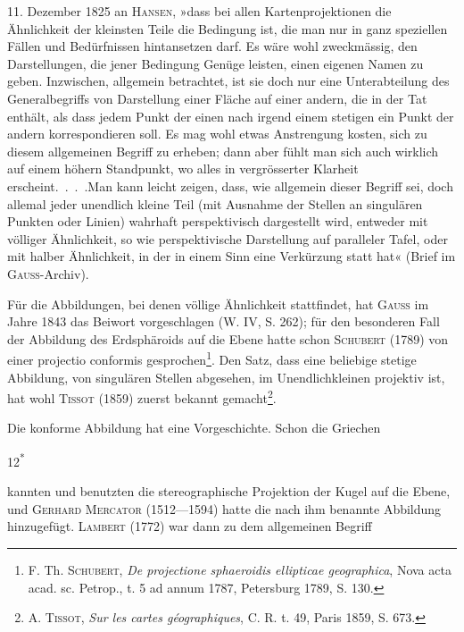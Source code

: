 11. Dezember 1825 an \textsc{Hansen}, »dass bei allen Kartenprojektionen die Ähnlichkeit
der kleinsten Teile die  Bedingung ist, die man nur in
ganz speziellen Fällen und Bedürfnissen hintansetzen darf. Es wäre wohl
zweckmässig, den Darstellungen, die jener Bedingung Genüge leisten, einen
eigenen Namen zu geben. Inzwischen, allgemein betrachtet, ist sie doch nur
eine Unterabteilung des Generalbegriffs von Darstellung einer Fläche auf einer
andern, die in der Tat  enthält, als dass jedem Punkt der
einen nach irgend einem stetigen  ein Punkt der andern korrespondieren
soll. Es mag wohl etwas Anstrengung kosten, sich zu diesem allgemeinen
Begriff zu erheben; dann aber fühlt man sich auch wirklich auf einem
höhern Standpunkt, wo alles in vergrösserter Klarheit erscheint.\ .\ .\ .\quad Man
kann leicht zeigen, dass, wie allgemein dieser Begriff sei, doch allemal jeder
unendlich kleine Teil (mit Ausnahme der Stellen an singulären Punkten oder
Linien) wahrhaft perspektivisch dargestellt wird, entweder mit völliger Ähnlichkeit,
so wie perspektivische Darstellung auf paralleler Tafel, oder mit halber
Ähnlichkeit, in der in einem Sinn eine Verkürzung statt hat« (Brief im \textsc{Gauss}-Archiv).
\par
Für die Abbildungen, bei denen völlige Ähnlichkeit stattfindet, hat \textsc{Gauss}
im Jahre 1843 das Beiwort  vorgeschlagen (W. IV, S. 262); für den
besonderen Fall der Abbildung des Erdsphäroids auf die Ebene hatte schon
\textsc{Schubert} (1789) von einer projectio conformis gesprochen\footnote{F. Th. \textsc{Schubert}, \textit{De projectione sphaeroidis ellipticae geographica}, Nova acta acad. sc. Petrop., t. 5 ad annum 1787, Petersburg 1789, S. 130.}. Den Satz, dass
eine beliebige stetige Abbildung, von singulären Stellen abgesehen, im Unendlichkleinen
projektiv ist, hat wohl \textsc{Tissot} (1859) zuerst bekannt gemacht\footnote{A. \textsc{Tissot}, \textit{Sur les cartes géographiques}, C. R. t. 49, Paris 1859, S. 673.}.
\par
Die konforme Abbildung hat eine Vorgeschichte. Schon die Griechen
\par\smallskip\noindent\hfill{\small 12\textsuperscript{*}}\par
\clearpage{}\setcounter{footnote}{0}
\noindent kannten und benutzten die stereographische Projektion der Kugel auf die
Ebene, und \textsc{Gerhard Mercator} (1512—1594) hatte die nach ihm benannte
Abbildung hinzugefügt. \textsc{Lambert} (1772) war dann zu dem allgemeinen Begriff
